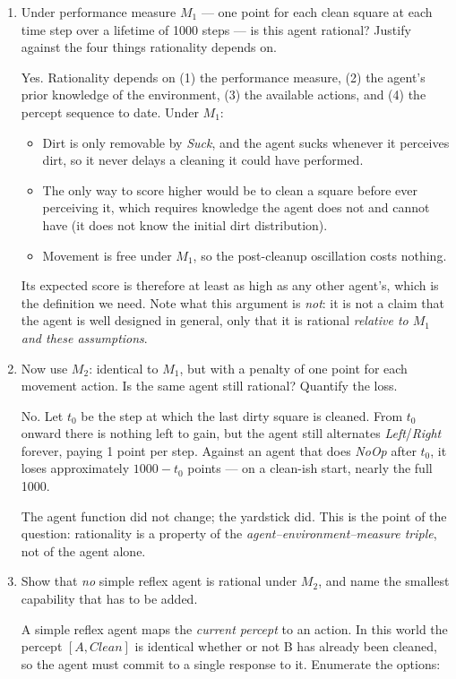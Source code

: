 \begin{enumerate}
\item Under performance measure $M_1$ --- one point for each clean square at each time step over
a lifetime of 1000 steps --- is this agent rational? Justify against the four things rationality
depends on.
\ansspace{4.0cm}
\begin{sol}
Yes. Rationality depends on (1) the performance measure, (2) the agent's prior knowledge of the
environment, (3) the available actions, and (4) the percept sequence to date. Under $M_1$:

\begin{itemize}[leftmargin=1.5em]
\item Dirt is only removable by \textit{Suck}, and the agent sucks whenever it perceives dirt,
so it never delays a cleaning it could have performed.
\item The only way to score higher would be to clean a square before ever perceiving it, which
requires knowledge the agent does not and cannot have (it does not know the initial dirt
distribution).
\item Movement is free under $M_1$, so the post-cleanup oscillation costs nothing.
\end{itemize}
Its expected score is therefore at least as high as any other agent's, which is the definition
we need. Note what this argument is \emph{not}: it is not a claim that the agent is well
designed in general, only that it is rational \emph{relative to $M_1$ and these assumptions}.
\end{sol}

\item Now use $M_2$: identical to $M_1$, but with a penalty of one point for each movement
action. Is the same agent still rational? Quantify the loss.
\ansspace{3.5cm}
\begin{sol}
No. Let $t_0$ be the step at which the last dirty square is cleaned. From $t_0$ onward there is
nothing left to gain, but the agent still alternates \textit{Left}/\textit{Right} forever,
paying 1 point per step. Against an agent that does \textit{NoOp} after $t_0$, it loses
approximately $1000 - t_0$ points --- on a clean-ish start, nearly the full 1000.

The agent function did not change; the yardstick did. This is the point of the question:
rationality is a property of the \emph{agent--environment--measure triple}, not of the agent
alone.
\end{sol}

\item Show that \emph{no} simple reflex agent is rational under $M_2$, and name the smallest
capability that has to be added.
\ansspace{4.5cm}
\begin{sol}
A simple reflex agent maps the \emph{current percept} to an action. In this world the percept
$[A, \textit{Clean}]$ is identical whether or not B has already been cleaned, so the agent must
commit to a single response to it. Enumerate the options:


\end{sol}
\end{enumerate}
